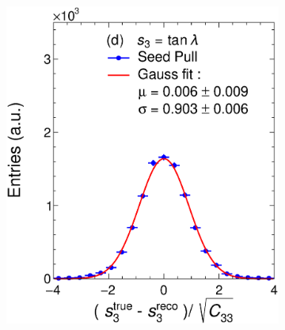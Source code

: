 \begin{figure}[!ht]
\begin{subfigure}{0.32\textwidth}
         \caption{}
         \label{fig:resp2SeedGAr}
     \end{subfigure}
          \begin{subfigure}{0.32\textwidth}
         \centering
         \includegraphics[width=\textwidth]{figures/ch4-KF_NDGArLite/MC/ALICE+KF/UnitSeed_p3.eps}
         \caption{}
         \label{fig:resp3SeedGAr}
     \end{subfigure}
     \begin{subfigure}{0.32\textwidth}
         \centering

\end{subfigure}
\end{figure}
